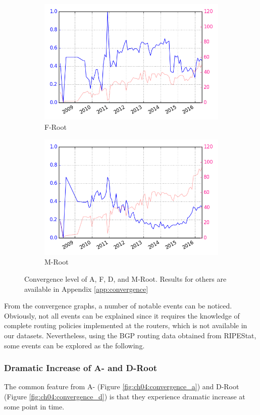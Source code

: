 \begin{figure}[h]
\begin{subfigure}{.5\textwidth}
		\centering
		\includegraphics[width=.8\linewidth]{img/convergence_over_time_f}
		\caption{F-Root}
		\label{fig:ch04:convergence_f}
	\end{subfigure}
	\begin{subfigure}{.5\textwidth}
		\centering
		\includegraphics[width=.8\linewidth]{img/convergence_over_time_m}
		\caption{M-Root}
		\label{fig:ch04:convergence_m}
	\end{subfigure}	
	\caption{Convergence level of A, F, D, and M-Root. Results for others are available in Appendix \ref{app:convergence}}
	\label{fig:ch04:convergence}
\end{figure}

From the convergence graphs, a number of notable events can be noticed. Obviously, not all events can be explained since it requires the knowledge of complete routing policies implemented at the routers, which is not available in our datasets. Nevertheless, using the BGP routing data obtained from RIPEStat, some events can be explored as the following. 

\subsubsection{Dramatic Increase of A- and D-Root}
The common feature from A- (Figure \ref{fig:ch04:convergence_a}) and D-Root (Figure \ref{fig:ch04:convergence_d}) is that they experience dramatic increase at some point in time. 

